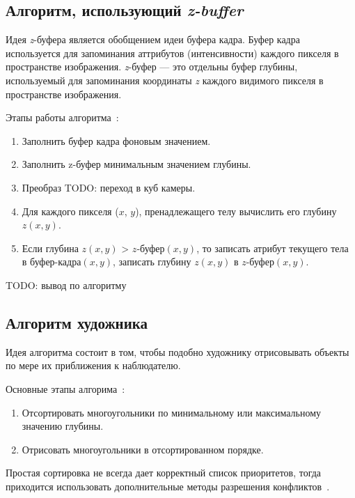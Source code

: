    \subsection{Алгоритм, использующий \textit{z-buffer}}
   
   Идея \textit{z}-буфера является обобщением идеи буфера кадра. Буфер кадра используется для запоминания аттрибутов (интенсивности) каждого пикселя в пространстве изображения. \textit{z}-буфер --- это отдельны буфер глубины, используемый для запоминания координаты \textit{z} каждого видимого пикселя в пространстве изображения\cite{rogers}.
   
   Этапы работы алгоритма~\cite{rogers}:
   
   \begin{enumerate}
   	\item[1)] Заполнить буфер кадра фоновым значением.
   	\item[2)] Заполнить z-буфер минимальным значением глубины.
   	\item[3)] Преобраз TODO: переход в куб камеры.
   	\item[4)] Для каждого пикселя ($x$, $y$), пренадлежащего телу вычислить его глубину $z(x, y)$.
   	\item[5)] Если глубина $z(x, y)$ > $z\textit{-буфер}(x, y)$, то записать атрибут текущего тела в $\textit{буфер-кадра}(x, y)$, записать глубину $z(x, y)$ в $z\textit{-буфер}(x, y)$.
   \end{enumerate}
   
   
   TODO: вывод по алгоритму
   
   \subsection{Алгоритм художника}
   
   Идея алгоритма состоит в том, чтобы подобно художнику отрисовывать объекты по мере их приближения к наблюдателю.
   
   Основные этапы алгорима~\cite{rogers}:
   \begin{enumerate}
   	\item[1)] Отсортировать многоугольники по минимальному или максимальному значению глубины.
   	\item[2)] Отрисовать многоугольники в отсортированном порядке.
   \end{enumerate}
   
   Простая сортировка не всегда дает корректный список приоритетов, тогда приходится использовать дополнительные методы разрешения конфликтов~\cite{rogers}. 
   
